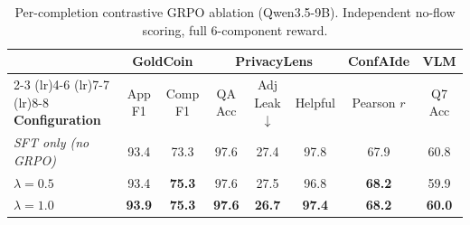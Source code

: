 \begin{table}[ht]
\centering
\caption{Per-completion contrastive GRPO ablation (Qwen3.5-9B). Independent no-flow scoring, full 6-component reward.}
\label{tab:grpo-ablation}
\begin{tabular}{lccccccc}
\toprule
 & \multicolumn{2}{c}{\textbf{GoldCoin}} & \multicolumn{3}{c}{\textbf{PrivacyLens}} & \multicolumn{1}{c}{\textbf{ConfAIde}} & \multicolumn{1}{c}{\textbf{VLM}} \\
\cmidrule(lr){2-3} \cmidrule(lr){4-6} \cmidrule(lr){7-7} \cmidrule(lr){8-8}
\textbf{Configuration} & App F1 & Comp F1 & QA Acc & Adj Leak $\downarrow$ & Helpful & Pearson $r$ & Q7 Acc \\
\midrule
\textit{SFT only (no GRPO)} & 93.4 & 73.3 & 97.6 & 27.4 & 97.8 & 67.9 & 60.8 \\
\midrule
$\lambda=0.5$ & 93.4 & \textbf{75.3} & 97.6 & 27.5 & 96.8 & \textbf{68.2} & 59.9 \\
$\lambda=1.0$ & \textbf{93.9} & \textbf{75.3} & \textbf{97.6} & \textbf{26.7} & \textbf{97.4} & \textbf{68.2} & \textbf{60.0} \\
\bottomrule
\end{tabular}
\end{table}